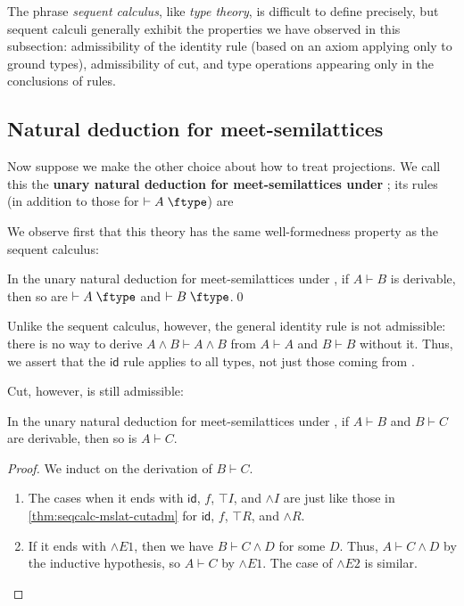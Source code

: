 \documentclass{book}
\let\types\vdash
\def\idfunc{\mathsf{id}}
\def\type{\;\ftype}
\let\meet\wedge
\def\meetR{\mathord{\meet}R}
\def\meetE{\mathord{\meet}E}
\def\meetI{\mathord{\meet}I}
\begin{document}
The phrase \emph{sequent calculus}, like \emph{type theory}, is difficult to define precisely, but sequent calculi generally exhibit the properties we have observed in this subsection: admissibility of the identity rule (based on an axiom applying only to ground types), admissibility of cut, and type operations appearing only in the conclusions of rules.

\subsection{Natural deduction for meet-semilattices}
\label{sec:natded-mslat}

Now suppose we make the other choice about how to treat projections.
We call this the \textbf{unary natural deduction for meet-semilattices under \cG}; its rules (in addition to those for $\types A\type$) are

We observe first that this theory has the same well-formedness property as the sequent calculus:

\begin{thm}\label{thm:natded-mslat-wftype}
  In the unary natural deduction for meet-semilattices under \cG, if $A\types B$ is derivable, then so are $\types A\type$ and $\types B\type$.\qed
\end{thm}

Unlike the sequent calculus, however, the general identity rule is not admissible: there is no way to derive $A\meet B \types A\meet B$ from $A\types A$ and $B\types B$ without it.
Thus, we assert that the $\idfunc$ rule applies to all types, not just those coming from \cG.

Cut, however, is still admissible:

\begin{thm}\label{thm:natded-mslat-cutadm}
  In the unary natural deduction for meet-semilattices under \cG, if $A\types B$ and $B\types C$ are derivable, then so is $A\types C$.
\end{thm}
\begin{proof}
  We induct on the derivation of $B\types C$.
  \begin{enumerate}
  \item The cases when it ends with $\idfunc$, $f$, $\top I$, and $\meetI$ are just like those in \cref{thm:seqcalc-mslat-cutadm} for $\idfunc$, $f$, $\top R$, and $\meetR$.
  \item If it ends with $\meetE1$, then we have $B\types C\meet D$ for some $D$.
    Thus, $A\types C\meet D$ by the inductive hypothesis, so $A\types C$ by $\meetE1$.
    The case of $\meetE2$ is similar.\qedhere
  \end{enumerate}
\end{proof}
\end{document}
